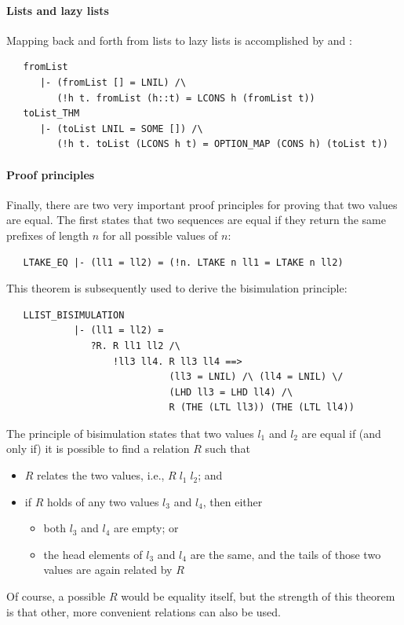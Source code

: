 \paragraph{Lists and lazy lists}

Mapping back and forth from lists to lazy lists is accomplished
by  and :
\begin{hol}\begin{verbatim}
   fromList
      |- (fromList [] = LNIL) /\
         (!h t. fromList (h::t) = LCONS h (fromList t))
   toList_THM
      |- (toList LNIL = SOME []) /\
         (!h t. toList (LCONS h t) = OPTION_MAP (CONS h) (toList t))
\end{verbatim}\end{hol}

\paragraph{Proof principles}

Finally, there are two very important proof principles for proving
that two  values are equal.  The first states that two
sequences are equal if they return the same prefixes of length $n$ for
all possible values of $n$:
\begin{hol}
\begin{verbatim}
   LTAKE_EQ |- (ll1 = ll2) = (!n. LTAKE n ll1 = LTAKE n ll2)
\end{verbatim}
\end{hol}
This theorem is subsequently used to derive the bisimulation
principle:
\begin{hol}
\begin{verbatim}
   LLIST_BISIMULATION
            |- (ll1 = ll2) =
               ?R. R ll1 ll2 /\
                   !ll3 ll4. R ll3 ll4 ==>
                             (ll3 = LNIL) /\ (ll4 = LNIL) \/
                             (LHD ll3 = LHD ll4) /\
                             R (THE (LTL ll3)) (THE (LTL ll4))
\end{verbatim}
\end{hol}
The principle of bisimulation states that two  values $l_1$
and $l_2$ are equal if (and only if) it is possible to find a
relation $R$ such that
\begin{itemize}
\item $R$ relates the two values, i.e., $R\;l_1\;l_2$; and
\item if $R$ holds of any two values $l_3$ and $l_4$, then either
  \begin{itemize}
  \item both $l_3$ and $l_4$ are empty; or
  \item the head elements of $l_3$ and $l_4$ are the same, and the
    tails of those two values are again related by $R$
  \end{itemize}
\end{itemize}
Of course, a possible $R$ would be equality itself, but the strength
of this theorem is that other, more convenient relations can also be
used.

